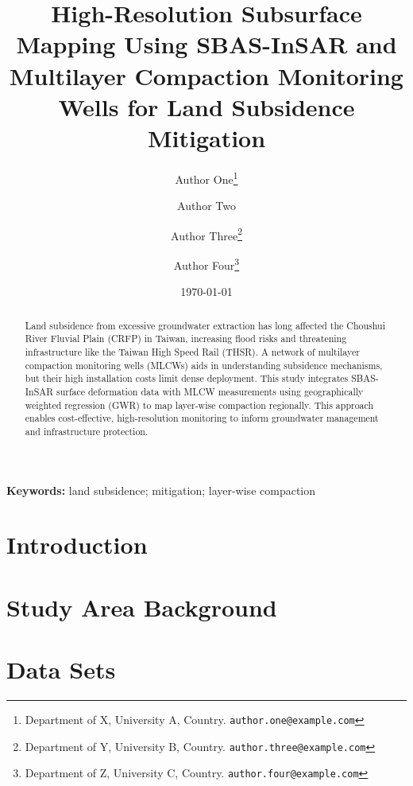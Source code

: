 \documentclass[12pt,twoside]{article}
\newcommand{\keywords}[1]{\vspace{2mm}\noindent\textbf{Keywords:} #1}
\begin{document}
\title{\textbf{High-Resolution Subsurface Mapping Using SBAS-InSAR and Multilayer Compaction Monitoring Wells for Land Subsidence Mitigation}}
\author{
  Author One\thanks{Department of X, University A, Country. \texttt{author.one@example.com}} \and
  Author Two\footnotemark[1] \and
  Author Three\thanks{Department of Y, University B, Country. \texttt{author.three@example.com}} \and
  Author Four\thanks{Department of Z, University C, Country. \texttt{author.four@example.com}}
}
\date{\today}
\maketitle

\begin{abstract}
Land subsidence from excessive groundwater extraction has long affected the Choushui River Fluvial Plain (CRFP) in Taiwan, increasing flood risks and threatening infrastructure like the Taiwan High Speed Rail (THSR). A network of multilayer compaction monitoring wells (MLCWs) aids in understanding subsidence mechanisms, but their high installation costs limit dense deployment. This study integrates SBAS-InSAR surface deformation data with MLCW measurements using geographically weighted regression (GWR) to map layer-wise compaction regionally. This approach enables cost-effective, high-resolution monitoring to inform groundwater management and infrastructure protection.
\end{abstract}

\keywords{land subsidence; mitigation; layer-wise compaction}

\tableofcontents
\listoffigures
\listoftables
\clearpage

\setcounter{page}{1}
\linenumbers %

\section{Introduction}
\label{sec:intro}

\section{Study Area Background}
\label{sec:studyarea}


\section{Data Sets}
\label{sec:dataset}

\end{document}
